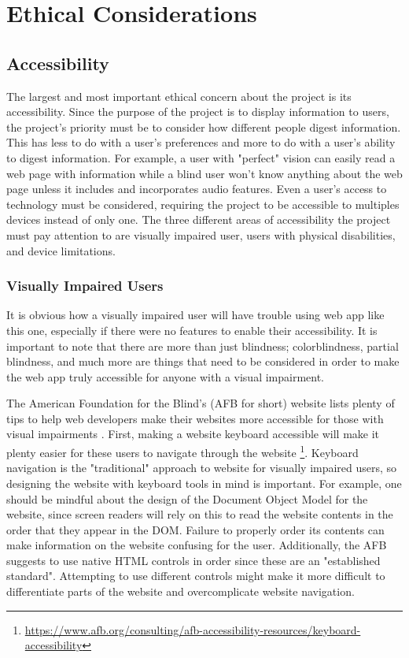 \documentclass[10pt,twocolumn]{article}
\begin{document}
\section{Ethical Considerations}

\subsection{Accessibility}

The largest and most important ethical concern about the project is its accessibility.
Since the purpose of the project is to display information to users, the project's priority must be to consider how different people digest information.
This has less to do with a user's preferences and more to do with a user's ability to digest information.
For example, a user with "perfect" vision can easily read a web page with information while a blind user won't know anything about the web page unless it includes and incorporates audio features.
Even a user's access to technology must be considered, requiring the project to be accessible to multiples devices instead of only one.
The three different areas of accessibility the project must pay attention to are visually impaired user, users with physical disabilities, and device limitations.

\subsubsection{Visually Impaired Users}

It is obvious how a visually impaired user will have trouble using web app like this one, especially if there were no features to enable their accessibility.
It is important to note that there are more than just blindness; colorblindness, partial blindness, and much more are things that need to be considered in order to make the web app truly accessible for anyone with a visual impairment.

The American Foundation for the Blind's (AFB for short) website lists plenty of tips to help web developers make their websites more accessible for those with visual impairments \cite{AFBAccessibilityResources}.
First, making a website keyboard accessible will make it plenty easier for these users to navigate through the website \footnote{\url{https://www.afb.org/consulting/afb-accessibility-resources/keyboard-accessibility}}.
Keyboard navigation is the "traditional" approach to website for visually impaired users, so designing the website with keyboard tools in mind is important.
For example, one should be mindful about the design of the Document Object Model for the website, since screen readers will rely on this to read the website contents in the order that they appear in the DOM.
Failure to properly order its contents can make information on the website confusing for the user.
Additionally, the AFB suggests to use native HTML controls in order since these are an "established standard". Attempting to use different controls might make it more difficult to differentiate parts of the website and overcomplicate website navigation.
\end{document}
